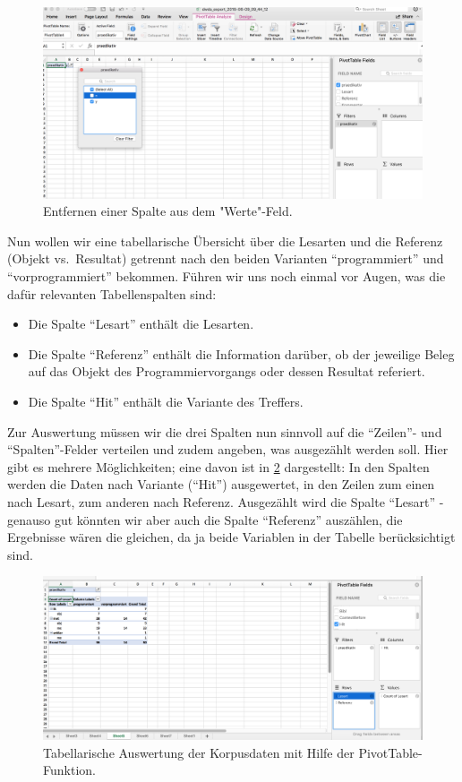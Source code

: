\documentclass[]{article}
\providecommand{\tightlist}{%
  \setlength{\itemsep}{0pt}\setlength{\parskip}{0pt}}
\begin{document}
\begin{figure}
\includegraphics[width=6.28in]{fig/praedikativ_filter} \caption{Entfernen einer Spalte aus dem "Werte"-Feld.}\label{fig:praedikativfilter}
\end{figure}

Nun wollen wir eine tabellarische Übersicht über die Lesarten und die
Referenz (Objekt vs.~Resultat) getrennt nach den beiden Varianten
``programmiert'' und ``vorprogrammiert'' bekommen. Führen wir uns noch
einmal vor Augen, was die dafür relevanten Tabellenspalten sind:

\begin{itemize}
\tightlist
\item
  Die Spalte ``Lesart'' enthält die Lesarten.
\item
  Die Spalte ``Referenz'' enthält die Information darüber, ob der
  jeweilige Beleg auf das Objekt des Programmiervorgangs oder dessen
  Resultat referiert.
\item
  Die Spalte ``Hit'' enthält die Variante des Treffers.
\end{itemize}

Zur Auswertung müssen wir die drei Spalten nun sinnvoll auf die
``Zeilen''- und ``Spalten''-Felder verteilen und zudem angeben, was
ausgezählt werden soll. Hier gibt es mehrere Möglichkeiten; eine davon
ist in \ref{fig:excelfilter} dargestellt: In den Spalten werden die
Daten nach Variante (``Hit'') ausgewertet, in den Zeilen zum einen nach
Lesart, zum anderen nach Referenz. Ausgezählt wird die Spalte ``Lesart''
- genauso gut könnten wir aber auch die Spalte ``Referenz'' auszählen,
die Ergebnisse wären die gleichen, da ja beide Variablen in der Tabelle
berücksichtigt sind.

\begin{figure}
\includegraphics[width=6.36in]{fig/excel_allfilters} \caption{Tabellarische Auswertung der Korpusdaten mit Hilfe der PivotTable-Funktion.}\label{fig:excelfilter}
\end{figure}
\end{document}
